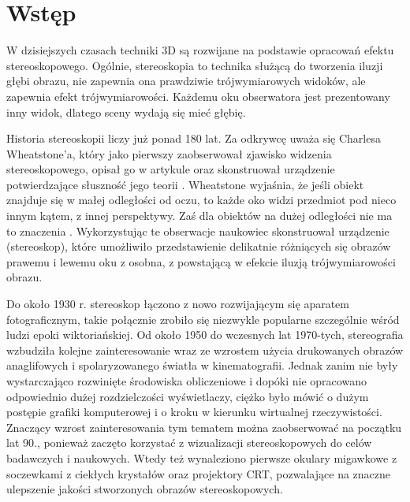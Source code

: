 
\graphicspath{{images/}}



\tableofcontents
\thispagestyle{empty}
\thesisstyle
\newpage 

\section[Wstęp]{Wstęp}
W dzisiejszych czasach techniki 3D są rozwijane na podstawie opracowań efektu stereoskopowego. Ogólnie, stereoskopia to technika służącą do tworzenia iluzji głębi obrazu, nie zapewnia ona prawdziwie trójwymiarowych widoków, ale zapewnia efekt trójwymiarowości. Każdemu oku obserwatora jest prezentowany inny widok, dlatego sceny wydają się mieć głębię.

Historia stereoskopii liczy już ponad 180 lat. Za odkrywcę uważa się Charlesa Wheatstone'a, który jako pierwszy zaobserwował zjawisko widzenia stereoskopowego, opisał go w artykule oraz skonstruował urządzenie potwierdzające słuszność jego teorii \cite{stereoscopehistory}. Wheatstone wyjaśnia, że jeśli obiekt znajduje się w małej odległości od oczu, to każde oko widzi przedmiot pod nieco innym kątem, z innej perspektywy. Zaś dla obiektów na dużej odległości nie ma to znaczenia \cite{wheatstone}. Wykorzystując te obserwacje naukowiec skonstruował urządzenie (stereoskop), które umożliwiło przedstawienie delikatnie różniących się obrazów prawemu i lewemu oku z osobna, z powstającą w efekcie iluzją trójwymiarowości obrazu.

Do około 1930 r. stereoskop łączono z nowo rozwijającym się aparatem fotograficznym, takie połącznie zrobiło się niezwykle popularne szczególnie wśród ludzi epoki wiktoriańskiej. Od około 1950 do wczesnych lat 1970-tych, stereografia wzbudziła kolejne zainteresowanie wraz ze wzrostem użycia drukowanych obrazów anaglifowych i spolaryzowanego światła w kinematografii. Jednak zanim nie były wystarczająco rozwinięte środowiska obliczeniowe i dopóki nie opracowano odpowiednio dużej rozdzielczości wyświetlaczy, ciężko było mówić o dużym postępie grafiki komputerowej i o kroku w kierunku wirtualnej rzeczywistości. Znaczący wzrost zainteresowania tym tematem można zaobserwować na początku lat 90., ponieważ zaczęto korzystać z wizualizacji stereoskopowych do celów badawczych i naukowych. Wtedy też wynaleziono pierwsze okulary migawkowe z soczewkami z ciekłych krystałów oraz projektory CRT, pozwalające na znaczne ulepszenie jakości stworzonych obrazów stereoskopowych.

